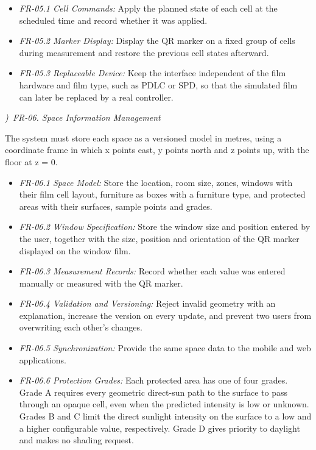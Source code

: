 \documentclass[conference]{IEEEtran}
\newcommand{\gapsubsub}{\vspace{0.4ex}}
\newcommand{\subsubhead}[1]{\par\noindent\refstepcounter{subsubsection}%
{\normalfont\normalsize\itshape\arabic{subsubsection})\ #1}\par\nopagebreak}
\begin{document}
\begin{itemize}
\item \textit{FR-05.1 Cell Commands:} Apply the planned state of each cell at the scheduled time and record whether it was applied.
\item \textit{FR-05.2 Marker Display:} Display the QR marker on a fixed group of cells during measurement and restore the previous cell states afterward.
\item \textit{FR-05.3 Replaceable Device:} Keep the interface independent of the film hardware and film type, such as PDLC or SPD, so that the simulated film can later be replaced by a real controller.
\end{itemize}

\gapsubsub
\subsubhead{FR-06. Space Information Management}
\noindent\hspace*{\parindent}The system must store each space as a versioned model in metres, using a coordinate frame in which x points east, y points north and z points up, with the floor at z = 0.

\begin{itemize}
\item \textit{FR-06.1 Space Model:} Store the location, room size, zones, windows with their film cell layout, furniture as boxes with a furniture type, and protected areas with their surfaces, sample points and grades.
\item \textit{FR-06.2 Window Specification:} Store the window size and position entered by the user, together with the size, position and orientation of the QR marker displayed on the window film.
\item \textit{FR-06.3 Measurement Records:} Record whether each value was entered manually or measured with the QR marker.
\item \textit{FR-06.4 Validation and Versioning:} Reject invalid geometry with an explanation, increase the version on every update, and prevent two users from overwriting each other's changes.
\item \textit{FR-06.5 Synchronization:} Provide the same space data to the mobile and web applications.
\item \textit{FR-06.6 Protection Grades:} Each protected area has one of four grades. Grade A requires every geometric direct-sun path to the surface to pass through an opaque cell, even when the predicted intensity is low or unknown. Grades B and C limit the direct sunlight intensity on the surface to a low and a higher configurable value, respectively. Grade D gives priority to daylight and makes no shading request.
\end{itemize}
\end{document}
